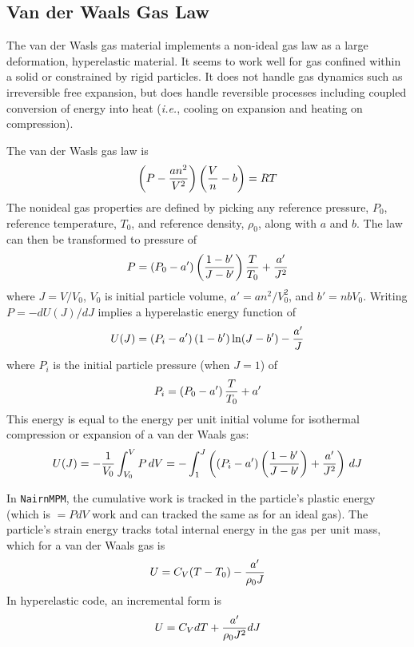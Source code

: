 \documentclass[11pt]{book}
\begin{document}
\subsection{Van der Waals Gas Law}

The van der Wasls gas material implements a non-ideal gas law as a large deformation, hyperelastic material. It seems to work well for gas confined within a solid or constrained by rigid particles. It does not handle gas dynamics such as irreversible free expansion, but does handle reversible processes including coupled conversion of energy into heat ({\em i.e.}, cooling on expansion and heating on compression).

The van der Wasls gas law is
\begin{equation}
    \left(P-{an^2\over V^2}\right)\left({V\over n}-b\right) = RT
\end{equation}
The nonideal gas properties are defined by picking any reference pressure, $P_0$, reference temperature, $T_0$, and reference density, $\rho_0$, along with $a$ and $b$. The law can then be transformed to
pressure of
\begin{equation}
    P = \left(P_0-a'\right)\left(1-b'\over J-b'\right){T\over T_0} + {a'\over J^2}
\end{equation}
where $J = V/V_0$, $V_0$ is initial particle volume, $a'=an^2/V_0^2$, and $b'=nbV_0$. Writing $P = - dU(J)/dJ$ implies a hyperelastic energy function of
\begin{equation}
    U(J) = \left(P_i-a'\right)\left(1-b'\right)\ln (J-b') - {a'\over J}
\end{equation}
where $P_i$ is the initial particle pressure (when $J=1$) of
\begin{equation}
    P_i = \left(P_0-a'\right){T\over T_0} + {a'}
\end{equation}
This energy is equal to the energy per unit initial volume for isothermal compression or expansion of a van der Waals gas:
\begin{equation}
    U(J) = - {1\over V_0} \int_{V_0}^V P\thinspace dV = -  \int_{1}^J \left(\left(P_i-a'\right)\left(1-b'\over J-b'\right) + {a'\over J^2}\right)\thinspace dJ
    \end{equation}

In {\tt NairnMPM}, the cumulative work is tracked in the particle's plastic energy (which is $=PdV$ work and can tracked the same as for an ideal gas). The particle's strain energy tracks total internal energy in the gas per unit mass, which for a van der Waals gas is
\begin{equation}
   U = C_V(T-T_0) - {a'\over  \rho_0 J}
\end{equation}
In hyperelastic code, an incremental form is
\begin{equation}
   U = C_V dT + {a'\over \rho_0 J^2} dJ
\end{equation}
\end{document}

